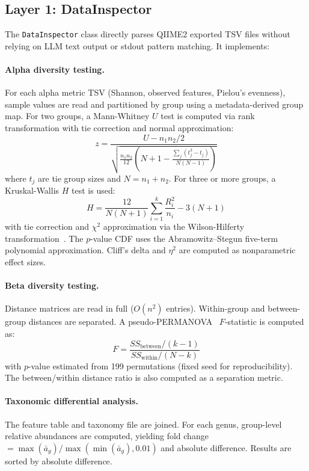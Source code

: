 \documentclass[11pt,a4paper]{article}
\begin{document}
\subsection{Layer 1: DataInspector}

The \texttt{DataInspector} class directly parses QIIME2 exported TSV
files without relying on LLM text output or stdout pattern matching.
It implements:

\paragraph{Alpha diversity testing.}
For each alpha metric TSV (Shannon, observed features, Pielou's
evenness), sample values are read and partitioned by group using a
metadata-derived group map.
For two groups, a Mann-Whitney $U$ test is computed via rank
transformation with tie correction and normal approximation:
\begin{equation}
  z = \frac{U - n_1 n_2 / 2}
           {\sqrt{\frac{n_1 n_2}{12}
                  \left( N + 1 - \frac{\sum_j (t_j^3 - t_j)}{N(N-1)} \right)}}
  \label{eq:mannwhitney}
\end{equation}
where $t_j$ are tie group sizes and $N = n_1 + n_2$.
For three or more groups, a Kruskal-Wallis $H$ test is used:
\begin{equation}
  H = \frac{12}{N(N+1)} \sum_{i=1}^{k} \frac{R_i^2}{n_i} - 3(N+1)
  \label{eq:kruskal}
\end{equation}
with tie correction and $\chi^2$ approximation via the
Wilson-Hilferty transformation~\citep{wilson1931}.
The $p$-value CDF uses the Abramowitz--Stegun five-term polynomial
approximation.
Cliff's delta and $\eta^2$ are computed as nonparametric effect sizes.

\paragraph{Beta diversity testing.}
Distance matrices are read in full ($O(n^2)$ entries).
Within-group and between-group distances are separated.
A pseudo-PERMANOVA~\citep{anderson2001} $F$-statistic is computed as:
\begin{equation}
  F = \frac{SS_{\text{between}} / (k - 1)}{SS_{\text{within}} / (N - k)}
\end{equation}
with $p$-value estimated from 199 permutations (fixed seed for
reproducibility).
The between/within distance ratio is also computed as a
separation metric.

\paragraph{Taxonomic differential analysis.}
The feature table and taxonomy file are joined.
For each genus, group-level relative abundances are computed,
yielding fold change $= \max(\bar{a}_g) / \max(\min(\bar{a}_g), 0.01)$
and absolute difference.
Results are sorted by absolute difference.
\end{document}
